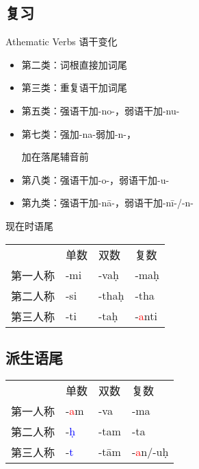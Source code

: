 \documentclass[17pt]{beamer}
\begin{document}
\subsection{复习}
\begin{frame}{Athematic Verbs  语干变化}
  \small
  \raggedright
  \begin{itemize}
    \item 第二类：词根直接加词尾
    \item 第三类：重复语干加词尾
    \item 第五类：强语干加\nobreakdash-no\nobreakdash-，弱语干加\nobreakdash-nu\nobreakdash-
    \item 第七类：强加\nobreakdash-na\nobreakdash-弱加\nobreakdash-n\nobreakdash-，
    
    \hspace*{4em}加在落尾辅音前
    \item 第八类：强语干加\nobreakdash-o\nobreakdash-，弱语干加\nobreakdash-u\nobreakdash-
    \item 第九类：强语干加\nobreakdash-nā\nobreakdash-，弱语干加\nobreakdash-nī\nobreakdash-/\nobreakdash-n\nobreakdash-
  \end{itemize}
\end{frame}

\begin{frame}{现在时语尾}
  \centering
  \begin{tabular}{@{}llll@{}} %
    & 单数  & 双数  & 复数 \\
    第一人称 & -mi & -vaḥ  & -maḥ  \\
    第二人称 & -si & -thaḥ & -tha  \\
    第三人称 & -ti & -taḥ & -\textcolor{red}{a}nti  \\
  \end{tabular}   
\end{frame}

\subsection{派生语尾}
\begin{frame}{\insertsubsection}
  \centering
  \begin{tabular}{@{}llll@{}} %
    & 单数  & 双数  & 复数 \\
    第一人称 & -\textcolor{red}{a}m & -va  & -ma  \\
    第二人称 & -\textcolor{blue}{ḥ} & -tam & -ta  \\
    第三人称 & -\textcolor{blue}{t} & -tām & -\textcolor{red}{a}n/-\textcolor{OliveGreen}{uḥ}  \\
  \end{tabular}   
\end{frame}
\end{document}
